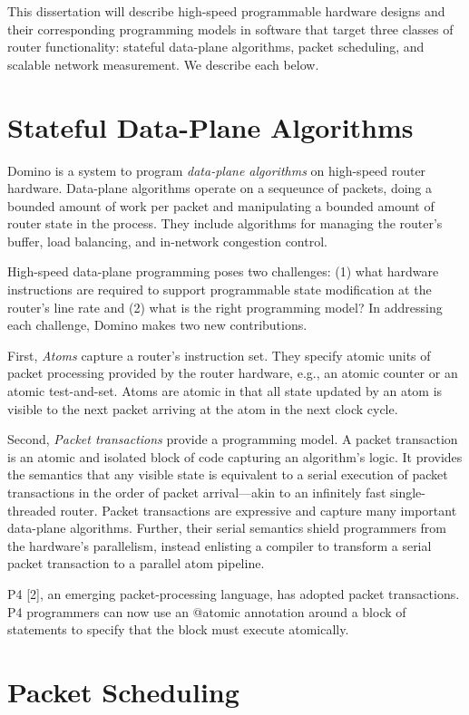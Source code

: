 This dissertation will describe high-speed programmable hardware designs and
their corresponding programming models in software that target three classes of
router functionality: stateful data-plane algorithms, packet scheduling, and
scalable network measurement. We describe each below.

\section{Stateful Data-Plane Algorithms}
Domino is a system to program \textit{data-plane algorithms} on high-speed
router hardware. Data-plane algorithms operate on a sequeunce of packets, doing
a bounded amount of work per packet and manipulating a bounded amount of router
state in the process.  They include algorithms for managing the router's
buffer, load balancing, and in-network congestion control.

High-speed data-plane programming poses two challenges: (1) what hardware instructions are required to support programmable state modification at the router’s line rate and (2) what is the right programming model? In addressing each challenge, Domino makes two new contributions.

First, \textit{Atoms} capture a router’s instruction set. They specify atomic
units of packet processing provided by the router hardware, e.g., an atomic
counter or an atomic test-and-set. Atoms are atomic in that all state updated
by an atom is visible to the next packet arriving at the atom in the next clock
cycle.

Second, \textit{Packet transactions} provide a programming model. A packet
transaction is an atomic and isolated block of code capturing an algorithm’s
logic. It provides the semantics that any visible state is equivalent to a
serial execution of packet transactions in the order of packet arrival—akin to
an infinitely fast single-threaded router. Packet transactions are expressive
and capture many important data-plane algorithms. Further, their serial
semantics shield programmers from the hardware’s parallelism, instead enlisting
a compiler to transform a serial packet transaction to a parallel atom
pipeline.

P4 [2], an emerging packet-processing language, has adopted packet transactions. P4 programmers can now use an @atomic annotation around a block of statements to specify that the block must execute atomically.

\section{Packet Scheduling}

